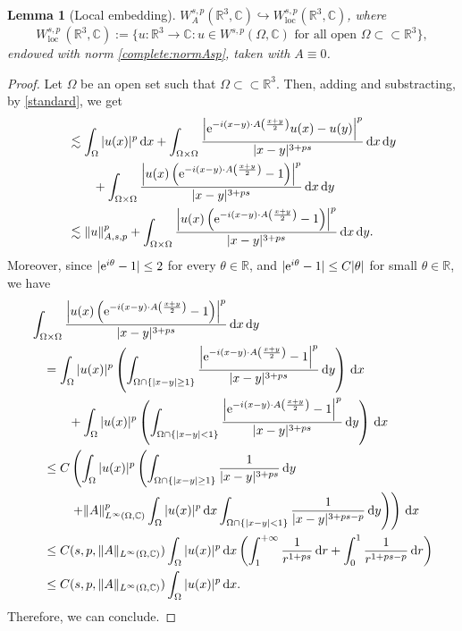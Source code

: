 \documentclass[leqno,11pt]{amsart}
\newcommand{\R}{\mathbb R}
\newcommand{\CC}{\mathbb C}
\newcommand{\C}{\mathbb C}
\newcommand{\loc}{\mathrm{loc}\,}
\numberwithin{equation}{section}
\newtheorem{lemma}[theorem]{Lemma}
\def\e{{\rm e}}
\begin{document}
\begin{lemma}[Local embedding]
\label{local:cont:emb}
$W^{s,p}_A(\R^3,\C) \hookrightarrow W^{s,p}_{\loc}(\R^3,\C)$, where
$$W^{s,p}_\loc(\R^3,\C):=\{u:\R^3\to\C : u\in W^{s,p}(\Omega,\C) \text{ for all open } \Omega \subset\subset \R^3\},$$
endowed with norm \eqref{complete:normAsp}, taken with $A \equiv 0$.
\end{lemma}
\begin{proof}
Let $\Omega$ be an open set such that $\Omega \subset\subset \R^3$. Then, adding and substracting, by \eqref{standard}, we get
\begin{align*}
	&\lesssim \int_{\Omega}|u(x)|^p \dd x
	+ \int_{\Omega \times \Omega}\frac{\left|\e^{-i(x-y)\cdot A\left(\frac{x+y}{2}\right)}u(x) - u(y)\right|^p}{|x-y|^{3+ps}} \dd x \dd y \\
	&\qquad + \int_{\Omega \times \Omega}\frac{\left|u(x)\left(\e^{-i(x-y)\cdot A\left(\frac{x+y}{2}\right)}-1\right)\right|^p}{|x-y|^{3+ps}} \dd x \dd y \\
	& \lesssim \|u\|_{A,s,p}^p + \int_{\Omega \times \Omega}\frac{\left|u(x)\left(\e^{-i(x-y)\cdot A\left(\frac{x+y}{2}\right)}-1\right)\right|^p}{|x-y|^{3+ps}} \dd x \dd y.
\end{align*}
Moreover, since $|\e^{i\theta} - 1| \leq 2$ for every $\theta \in \R$, and $|\e^{i\theta} - 1| \leq C|\theta|$ for small $\theta \in \R$, we have
\begin{align*}
	&    \int_{\Omega \times \Omega}\frac{\left|u(x)\left(\e^{-i(x-y)\cdot A\left(\frac{x+y}{2}\right)}-1\right)\right|^p}{|x-y|^{3+ps}}\dd x \dd y \\
    &  \quad =\int_{\Omega}|u(x)|^p\left( \int_{\Omega \cap \left\{|x-y| \geq 1\right\}}\frac{\left|\e^{-i(x-y)\cdot A\left(\frac{x+y}{2}\right)}-1\right|^p}{|x-y|^{3+ps}} \dd y\right) \dd x \\
    & \quad\qquad + \int_{\Omega}|u(x)|^p \left( \int_{\Omega \cap \left\{|x-y| < 1\right\}}\frac{\left|\e^{-i(x-y)\cdot A\left(\frac{x+y}{2}\right)}-1\right|^p}{|x-y|^{3+ps}} \dd y\right)  \dd x\\
	& \quad\leq C\left(\int_{\Omega}|u(x)|^p \left(\int_{\Omega \cap \left\{|x-y| \geq 1\right\}}\frac{1}{|x-y|^{3+ps}} \dd y \right.\right.\\
	& \quad\qquad \left.\left.+ \|A\|^p_{L^{\infty}(\Omega, \CC)}\int_{\Omega}|u(x)|^p \dd x \int_{\Omega \cap \left\{|x-y| < 1\right\}}\frac{1}{|x-y|^{3+ps-p}} \dd y \right)\right) \dd x \\
	& \quad\leq C(s,p,\|A\|_{L^{\infty}(\Omega, \CC)})\int_{\Omega}|u(x)|^p \dd x \left(\int_1^{+\infty}\frac{1}{r^{1+ps}} \dd r + \int_0^1\frac{1}{r^{1+ps-p}} \dd r \right)\\
	& \quad\leq C(s,p,\|A\|_{L^{\infty}(\Omega, \CC)})\int_{\Omega}|u(x)|^p \dd x.
\end{align*}
Therefore, we can conclude.
\end{proof}
\end{document}
